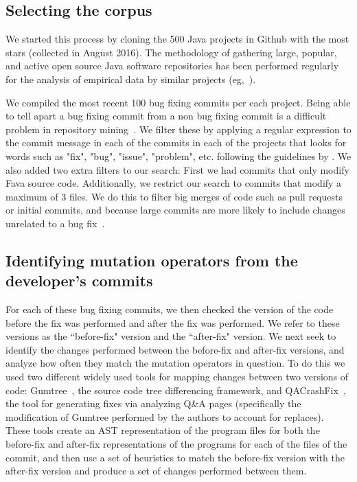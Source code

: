 \documentclass[conference]{IEEEtran}
\begin{document}
\subsection{Selecting the corpus}
We started this process by cloning the 500 Java projects in Github 
with the most stars (collected in August 2016). The methodology of 
gathering large,
popular, and active open source Java software repositories has been performed 
regularly for the analysis of empirical data by similar projects (eg,~\cite{Ray14}). 

We compiled the most recent 100 bug fixing commits per each project. Being able to tell apart a bug fixing commit from a non bug fixing commit is a difficult problem in repository mining~\cite{Bird09}. We filter these by applying a regular expression to the commit message in each of the commits in each of the projects that looks for words such as "fix", "bug", "issue", "problem", etc. following the guidelines by \cite{schroter06,Cubranic05,Fischer03}.
We also added two extra filters to our search: First we had commits that only 
modify Fava source code.  Additionally, we restrict our search to commits 
that modify a maximum of 3 files. We do this to
filter big merges of code such as pull requests or initial commits, and because
large commits are more likely to include changes unrelated to a bug fix~\cite{Dias15,Herzig13,Matsuda15,Kawrykow11}.

\subsection{Identifying mutation operators from the developer's commits}

For each of these bug fixing commits, we then checked the version of the code 
before the fix was performed and after the fix was performed. We refer to these 
versions as the ``before-fix" version and the ``after-fix" version.
We next seek to identify the changes performed between the before-fix and
after-fix versions, and analyze how often they match the mutation operators in
question. 
%
To do this we used two different widely used tools for mapping changes 
between two versions of code: Gumtree~\cite{falleri14}, the source code tree differencing framework, and QACrashFix~\cite{gao15}, the tool for generating fixes via analyzing Q\&A pages (specifically the modification of Gumtree performed by the authors to account for replaces).
These tools create an AST representation of the program files for both the 
before-fix and after-fix representations of the programs for each of the files 
of the commit, and then use a set of heuristics to match the before-fix version 
with the after-fix version and produce a set of 
changes performed between them. 
\end{document}

